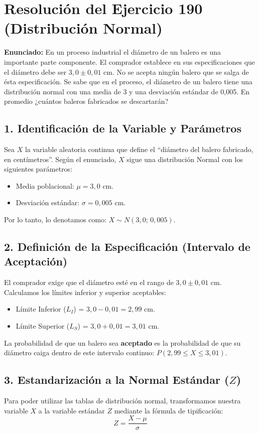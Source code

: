 \documentclass[11pt, a4paper]{article}
\begin{document}
\section*{Resolución del Ejercicio 190 (Distribución Normal)}

\textbf{Enunciado:} En un proceso industrial el diámetro de un balero es una importante parte componente. El comprador establece en sus especificaciones que el diámetro debe ser $3,0 \pm 0,01$ cm. No se acepta ningún balero que se salga de ésta especificación. Se sabe que en el proceso, el diámetro de un balero tiene una distribución normal con una media de 3 y una desviación estándar de 0,005. En promedio ¿cuántos baleros fabricados se descartarán?

\vspace{0.5cm}

\subsection*{1. Identificación de la Variable y Parámetros}
Sea $X$ la variable aleatoria continua que define el ``diámetro del balero fabricado, en centímetros''.
Según el enunciado, $X$ sigue una distribución Normal con los siguientes parámetros:
\begin{itemize}
    \item Media poblacional: $\mu = 3,0$ cm.
    \item Desviación estándar: $\sigma = 0,005$ cm.
\end{itemize}
Por lo tanto, lo denotamos como: $X \sim N(3,0; \, 0,005)$.

\subsection*{2. Definición de la Especificación (Intervalo de Aceptación)}
El comprador exige que el diámetro esté en el rango de $3,0 \pm 0,01$ cm.
Calculamos los límites inferior y superior aceptables:
\begin{itemize}
    \item Límite Inferior ($L_I$) = $3,0 - 0,01 = 2,99$ cm.
    \item Límite Superior ($L_S$) = $3,0 + 0,01 = 3,01$ cm.
\end{itemize}
La probabilidad de que un balero sea \textbf{aceptado} es la probabilidad de que su diámetro caiga dentro de este intervalo continuo: $P(2,99 \le X \le 3,01)$.

\subsection*{3. Estandarización a la Normal Estándar ($Z$)}
Para poder utilizar las tablas de distribución normal, transformamos nuestra variable $X$ a la variable estándar $Z$ mediante la fórmula de tipificación:
\[ Z = \frac{X - \mu}{\sigma} \]
\end{document}
